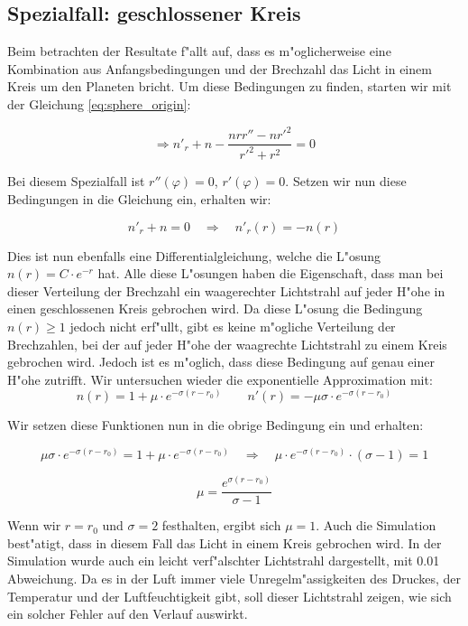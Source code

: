 \begin{refsection}
\newpage

\subsection{Spezialfall: geschlossener Kreis}
Beim betrachten der Resultate f"allt auf, dass es m"oglicherweise eine Kombination aus Anfangsbedingungen und der Brechzahl das Licht in einem Kreis um den Planeten bricht. 
Um diese Bedingungen zu finden, starten wir mit der Gleichung \ref{eq:sphere_origin}:

$$\Rightarrow n'_r + n - \frac{n r r'' - n r'^2}{r'^2 + r^2} = 0$$

Bei diesem Spezialfall ist $r''(\varphi) = 0$, $r'(\varphi) = 0$. 
Setzen wir nun diese Bedingungen in die Gleichung ein, erhalten wir:

$$n'_r + n = 0 \quad \Rightarrow \quad n'_r(r) = -n(r)$$

Dies ist nun ebenfalls eine Differentialgleichung, welche die L"osung $n(r) = C \cdot e^{-r}$ hat.
Alle diese L"osungen haben die Eigenschaft, dass man bei dieser Verteilung der Brechzahl ein waagerechter Lichtstrahl auf jeder H"ohe in einen geschlossenen Kreis gebrochen wird.
Da diese L"osung die Bedingung $n(r) \geq 1$ jedoch nicht erf"ullt, gibt es keine m"ogliche Verteilung der Brechzahlen, bei der auf jeder H"ohe der waagrechte Lichtstrahl zu einem Kreis gebrochen wird. 
Jedoch ist es m"oglich, dass diese Bedingung auf genau einer H"ohe zutrifft. 
Wir untersuchen wieder die exponentielle Approximation mit:
$$n(r) = 1 + \mu \cdot e^{-\sigma (r-r_0)} \qquad n'(r) = -\mu \sigma \cdot e^{-\sigma (r-r_0)}$$

Wir setzen diese Funktionen nun in die obrige Bedingung ein und erhalten:

$$\mu \sigma \cdot e^{-\sigma (r-r_0)} = 1 + \mu \cdot e^{-\sigma (r-r_0)} \quad \Rightarrow \quad \mu \cdot e^{-\sigma (r-r_0)} \cdot (\sigma - 1) = 1$$

$$\mu = \frac{e^{\sigma (r-r_0)}}{\sigma - 1}$$

Wenn wir $r = r_0$ und $\sigma = 2$ festhalten, ergibt sich $\mu = 1$. 
Auch die Simulation best"atigt, dass in diesem Fall das Licht in einem Kreis gebrochen wird.
In der Simulation wurde auch ein leicht verf"alschter Lichtstrahl dargestellt, mit 0.01 Abweichung. 
Da es in der Luft immer viele Unregelm"assigkeiten des Druckes, der Temperatur und der Luftfeuchtigkeit gibt, soll dieser Lichtstrahl zeigen, wie sich ein solcher Fehler auf den Verlauf auswirkt.


\end{refsection}
